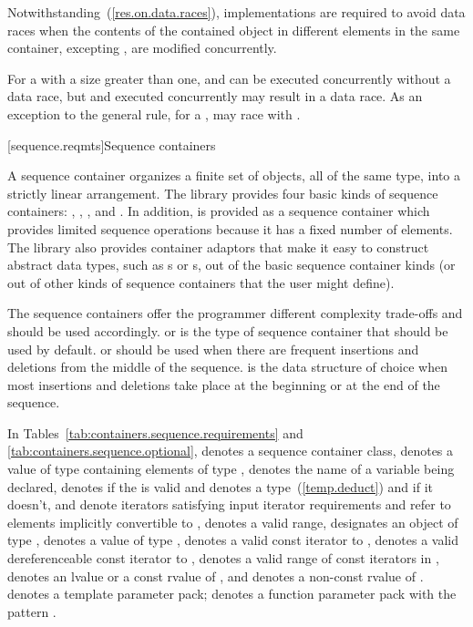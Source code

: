 \pnum
Notwithstanding~(\ref{res.on.data.races}), implementations are required to avoid data
races when the contents of the contained object in different elements in the same
container, excepting , are modified concurrently.

\pnum
\enternote For a  with a size greater than one, 
and  can be executed concurrently without a data race, but
 and  executed concurrently may result in a data
race.
As an exception to the general rule, for a , 
may race with .
\exitnote

[sequence.reqmts]{Sequence containers}

\pnum
A sequence container organizes a finite set of objects, all of the same type, into a strictly
linear arrangement. The library provides four basic kinds of sequence containers:
, , , and . In addition,
 is provided as a sequence container which provides limited sequence operations
because it has a fixed number of elements. The library also provides container adaptors that
make it easy to construct abstract data types, such as s or s, out of
the basic sequence container kinds (or out of other kinds of sequence containers that the user
might define).

\pnum
The sequence containers
offer the programmer different complexity trade-offs and should be used
accordingly.
 or 
is the type of sequence container that should be used by default.
 or 
should be used when there are frequent insertions and deletions from the
middle of the sequence.
is the data structure of choice
when most insertions and deletions take place at the beginning or at the
end of the sequence.

\pnum
In Tables~\ref{tab:containers.sequence.requirements}
and \ref{tab:containers.sequence.optional},
 denotes a sequence container class,
 denotes a value of type  containing elements of type ,
 denotes the name of a variable being declared,
 denotes  if
the   is valid and denotes a
type~(\ref{temp.deduct}) and
 if it doesn't,
 and 
denote iterators satisfying input iterator requirements
and refer to elements implicitly convertible to ,
\tcode{[i, j)}
denotes a valid range,
 designates an object of type ,
denotes a value of type ,
 denotes a valid const iterator to
, 
denotes a valid dereferenceable const iterator to
, \tcode{[q1, q2)}
denotes a valid range of const iterators in
, 
denotes an lvalue or a const rvalue of
, and  denotes
a non-const rvalue of .
 denotes a template parameter pack;
 denotes a function parameter pack with the pattern .

